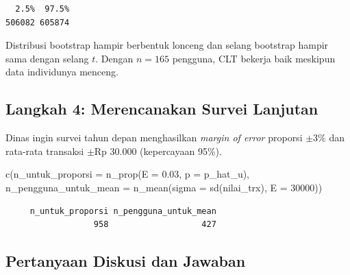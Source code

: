 \documentclass[
  indonesian,
  letterpaper,
]{book}
\newenvironment{Shaded}{\begin{snugshade}}{\end{snugshade}}
\newcommand{\AttributeTok}[1]{\textcolor[rgb]{0.40,0.45,0.13}{#1}}
\newcommand{\DecValTok}[1]{\textcolor[rgb]{0.68,0.00,0.00}{#1}}
\newcommand{\FloatTok}[1]{\textcolor[rgb]{0.68,0.00,0.00}{#1}}
\newcommand{\FunctionTok}[1]{\textcolor[rgb]{0.28,0.35,0.67}{#1}}
\newcommand{\NormalTok}[1]{\textcolor[rgb]{0.00,0.23,0.31}{#1}}
\begin{document}
\begin{verbatim}
  2.5%  97.5% 
506082 605874 
\end{verbatim}

Distribusi bootstrap hampir berbentuk lonceng dan selang bootstrap
hampir sama dengan selang \(t\). Dengan \(n = 165\) pengguna, CLT
bekerja baik meskipun data individunya menceng.

\subsection{Langkah 4: Merencanakan Survei
Lanjutan}\label{langkah-4-merencanakan-survei-lanjutan}

Dinas ingin survei tahun depan menghasilkan \emph{margin of error}
proporsi \(\pm 3\%\) dan rata-rata transaksi \(\pm \text{Rp } 30.000\)
(kepercayaan 95\%).

\begin{Shaded}
\begin{Highlighting}[]
\FunctionTok{c}\NormalTok{(}\AttributeTok{n\_untuk\_proporsi =} \FunctionTok{n\_prop}\NormalTok{(}\AttributeTok{E =} \FloatTok{0.03}\NormalTok{, }\AttributeTok{p =}\NormalTok{ p\_hat\_u),}
  \AttributeTok{n\_pengguna\_untuk\_mean =} \FunctionTok{n\_mean}\NormalTok{(}\AttributeTok{sigma =} \FunctionTok{sd}\NormalTok{(nilai\_trx), }\AttributeTok{E =} \DecValTok{30000}\NormalTok{))}
\end{Highlighting}
\end{Shaded}

\begin{verbatim}
     n_untuk_proporsi n_pengguna_untuk_mean 
                  958                   427 
\end{verbatim}

\subsection{Pertanyaan Diskusi dan
Jawaban}\label{pertanyaan-diskusi-dan-jawaban-5}
\end{document}
